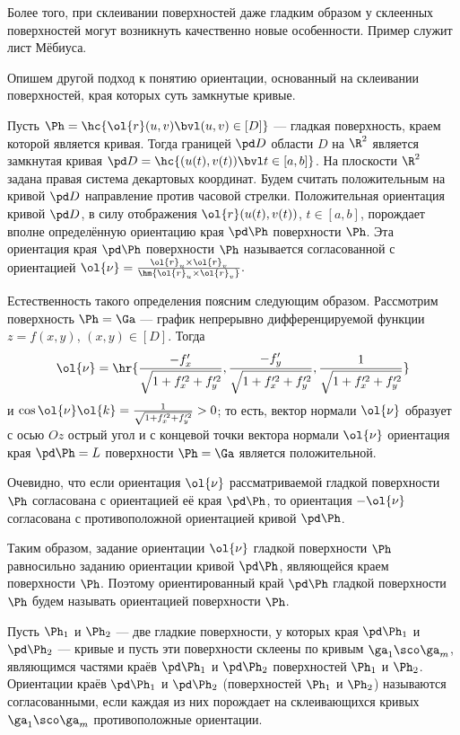 \documentclass[a4paper]{article}
\begin{document}
Более того, при склеивании поверхностей даже  гладким образом
у склеенных поверхностей могут возникнуть качественно новые
особенности. Пример служит лист Мёбиуса.

Опишем другой подход к понятию ориентации, основанный на склеивании
поверхностей, края которых суть замкнутые кривые.

Пусть $\Ph=\hc{\ol{r}(u,v)\bvl (u,v)\in[D]}$ --- гладкая
поверхность, краем которой является кривая. Тогда границей $\pd D$
области $D$ на $\R^2$ является замкнутая кривая $\pd
D=\hc{(u(t),v(t))\bvl t\in[a,b]}$. На плоскости $\R^2$ задана правая
система декартовых координат. Будем считать положительным на кривой
$\pd D$ направление против часовой стрелки. Положительная ориентация
кривой $\pd D$, в силу отображения $\ol{r}(u(t),v(t))$, $t\in[a,b]$,
порождает вполне определённую ориентацию края $\pd \Ph$ поверхности
$\Ph$. Эта ориентация края $\pd \Ph$ поверхности $\Ph$ называется
согласованной с ориентацией
$\ol{\nu}=\frac{\ol{r}_u\times\ol{r}_v}{\hm{\ol{r}_u\times\ol{r}_v}}.$

Естественность такого определения поясним следующим образом.
Рассмотрим поверхность $\Ph=\Ga$ --- график непрерывно
дифференцируемой функции $z=f(x,y)$, $(x,y)\in[D]$. Тогда $$\ol{\nu}
= \hr{\frac{-f'_x}{\sqrt{1+f'^2_x+f'^2_y}},
\frac{-f'_y}{\sqrt{1+f'^2_x+f'^2_y}},
\frac1{\sqrt{1+f'^2_x+f'^2_y}}}$$ и $\cos\ol{\nu}\ol{k} =
\frac1{\sqrt{1+f'^2_x+f'^2_y}}>0$; то есть, вектор нормали
$\ol{\nu}$ образует с осью $Oz$ острый угол и с концевой точки
вектора нормали $\ol{\nu}$ ориентация края $\pd\Ph=L$ поверхности
$\Ph=\Ga$ является положительной.

Очевидно, что если ориентация $\ol{\nu}$ рассматриваемой гладкой
поверхности $\Ph$ согласована с ориентацией её края $\pd\Ph$, то
ориентация $-\ol{\nu}$ согласована с противоположной ориентацией
кривой $\pd\Ph$.

Таким образом, задание ориентации $\ol{\nu}$ гладкой поверхности
$\Ph$ равносильно заданию ориентации кривой $\pd\Ph$, являющейся
краем поверхности $\Ph$. Поэтому ориентированный край $\pd\Ph$
гладкой поверхности $\Ph$ будем называть ориентацией поверхности
$\Ph$.

Пусть $\Ph_1$ и $\Ph_2$ --- две гладкие поверхности, у которых края
$\pd\Ph_1$ и $\pd\Ph_2$ --- кривые и пусть эти поверхности склеены
по кривым $\ga_1\sco\ga_m$, являющимся частями краёв $\pd\Ph_1$ и
$\pd\Ph_2$ поверхностей $\Ph_1$ и $\Ph_2$. Ориентации краёв $\pd
\Ph_1$ и $\pd\Ph_2$ (поверхностей $\Ph_1$ и $\Ph_2$) называются
согласованными, если каждая из них порождает на склеивающихся кривых
$\ga_1\sco\ga_m$ противоположные ориентации.
\end{document}
